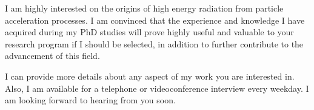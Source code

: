 \documentclass[11pt,a4paper,sans]{moderncv}        %
\begin{document}
I am highly interested on the origins of high energy radiation from
particle acceleration processes. I am convinced that the experience and
knowledge I have acquired during my PhD studies will prove highly useful
and valuable to your research program if I should be selected, in addition
to further contribute to the advancement of this field.

I can provide more details about any aspect of my work you are interested
in. Also, I am available for a telephone or videoconference interview every
weekday. I am looking forward to hearing from you soon.

\makeletterclosing%
\end{document}
